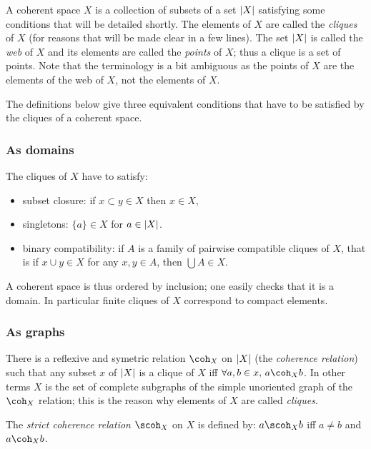 A coherent space \(X\) is a collection of subsets of a set \(\left|X\right|\)
satisfying some conditions that will be detailed shortly. The elements
of \(X\) are called the \emph{cliques} of \(X\) (for reasons that will
be made clear in a few lines). The set \(\left|X\right|\) is called the
\emph{web} of \(X\) and its elements are called the \emph{points} of
\(X\); thus a clique is a set of points. Note that the terminology is a
bit ambiguous as the points of \(X\) are the elements of the web of
\(X\), not the elements of \(X\).

The definitions below give three equivalent conditions that have to be
satisfied by the cliques of a coherent space.

\subsubsection{As domains}\label{as-domains}

The cliques of \(X\) have to satisfy:

\begin{itemize}
\item subset closure: if \(x\subset y\in X\) then \(x\in X\),
\item singletons: \(\{a\}\in X\) for \(a\in\left|X\right|\).
\item binary compatibility: if \(A\) is a family of pairwise compatible
  cliques of \(X\), that is if \(x\cup y\in X\) for any \(x,y\in A\),
  then \(\bigcup A\in X\).
\end{itemize}

A coherent space is thus ordered by inclusion; one easily checks that it
is a domain. In particular finite cliques of \(X\) correspond to compact
elements.

\subsubsection{As graphs}\label{as-graphs}

There is a reflexive and symetric relation \(\coh_X\) on \(\left|X\right|\) (the
\emph{coherence relation}) such that any subset \(x\) of \(\left|X\right|\) is a
clique of \(X\) iff \(\forall a,b\in x,\, a\coh_X b\). In other terms
\(X\) is the set of complete subgraphs of the simple unoriented graph of
the \(\coh_X\) relation; this is the reason why elements of \(X\) are
called \emph{cliques}.

The \emph{strict coherence relation} \(\scoh_X\) on \(X\) is defined by:
\(a\scoh_X b\) iff \(a\neq b\) and \(a\coh_X b\).

